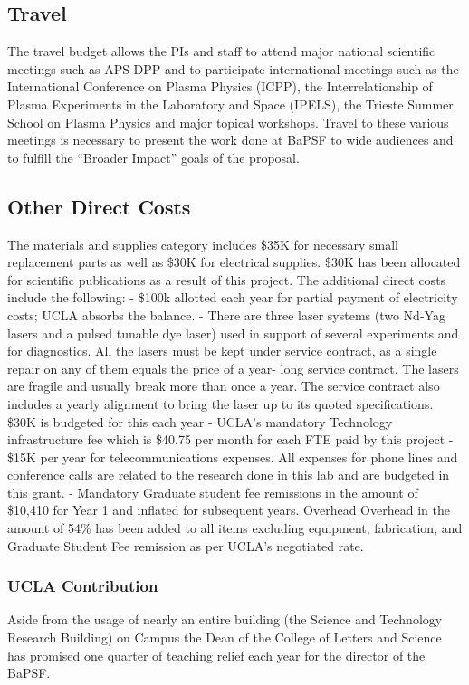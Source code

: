 \documentclass[11pt]{article}
\begin{document}
\subsection*{Travel}

The travel budget allows the PIs and staff to attend major national
scientific meetings such as APS-DPP and to participate international
meetings such as the International Conference on Plasma Physics
(ICPP), the Interrelationship of Plasma Experiments in the Laboratory
and Space (IPELS), the Trieste Summer School on Plasma Physics and
major topical workshops. Travel to these various meetings is necessary
to present the work done at BaPSF to wide audiences and to fulfill the
“Broader Impact” goals of the proposal.  

\subsection*{Other Direct Costs}

The materials and supplies category includes \$35K for necessary small
replacement parts as well as \$30K for electrical supplies. \$30K has
been allocated for scientific publications as a result of this
project. The additional direct costs include the following: - \$100k
allotted each year for partial payment of electricity costs; UCLA
absorbs the balance.  - There are three laser systems (two Nd-Yag
lasers and a pulsed tunable dye laser) used in support of several
experiments and for diagnostics. All the lasers must be kept under
service contract, as a single repair on any of them equals the price
of a year- long service contract. The lasers are fragile and usually
break more than once a year. The service contract also includes a
yearly alignment to bring the laser up to its quoted
specifications. \$30K is budgeted for this each year - UCLA’s mandatory
Technology infrastructure fee which is \$40.75 per month for each FTE
paid by this project - \$15K per year for telecommunications
expenses. All expenses for phone lines and conference calls are
related to the research done in this lab and are budgeted in this
grant.  - Mandatory Graduate student fee remissions in the amount of
\$10,410 for Year 1 and inflated for subsequent years.  Overhead
Overhead in the amount of 54\% has been added to all items excluding
equipment, fabrication, and Graduate Student Fee remission as per
UCLA’s negotiated rate.  



\subsubsection*{UCLA Contribution}

 Aside from the usage of
nearly an entire building (the Science and Technology Research
Building) on Campus the Dean of the College of Letters and Science has
promised one quarter of teaching relief each year for the director of
the BaPSF.
\end{document}
